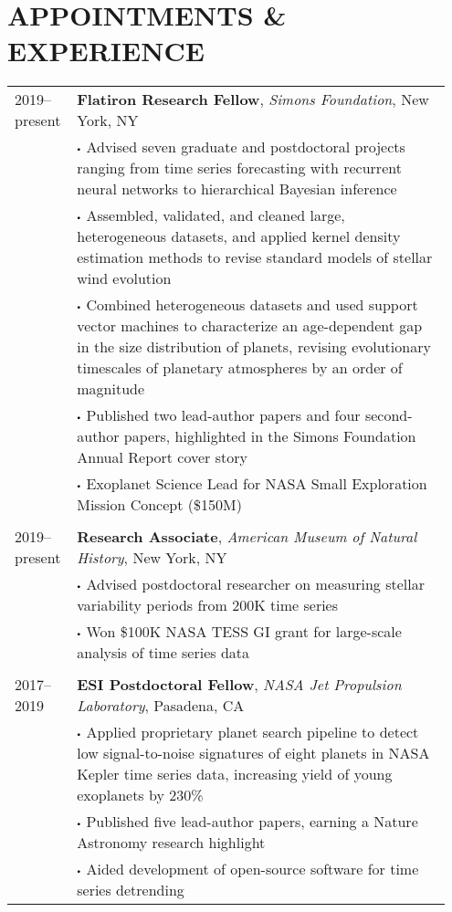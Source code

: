\iffalse 
\section{\large APPOINTMENTS \& EXPERIENCE}
\begin{tabular}{p{0.12\linewidth} p{0.83\linewidth}}
2019--present & \textbf{Flatiron Research Fellow}, \textit{Simons Foundation}, New York, NY\\
& $\sbullet$ Advised seven graduate and postdoctoral projects ranging from time series forecasting with recurrent neural networks to hierarchical Bayesian inference \\
& $\sbullet$ Assembled, validated, and cleaned large, heterogeneous datasets, and applied kernel density estimation methods to revise standard models of stellar wind evolution \\
& $\sbullet$ Combined heterogeneous datasets and used support vector machines to characterize an age-dependent gap in the size distribution of planets, revising evolutionary timescales of planetary atmospheres by an order of magnitude \\
& $\sbullet$ Published two lead-author papers and four second-author papers, highlighted in the Simons Foundation Annual Report cover story\\
& $\sbullet$ Exoplanet Science Lead for NASA Small Exploration Mission Concept (\$150M)\\
\\
2019--present & \textbf{Research Associate}, \textit{American Museum of Natural History}, New York, NY \\
& $\sbullet$ Advised postdoctoral researcher on measuring stellar variability periods from 200K time series\\
& $\sbullet$ Won \$100K NASA TESS GI grant for large-scale analysis of time series data \\
\\
2017--2019 & \textbf{ESI Postdoctoral Fellow}, \textit{NASA Jet Propulsion Laboratory}, Pasadena, CA\\
& $\sbullet$ Applied proprietary planet search pipeline to detect low signal-to-noise signatures of eight planets in NASA Kepler time series data, increasing yield of young exoplanets by 230\%\\
& $\sbullet$ Published five lead-author papers, earning a Nature Astronomy research highlight\\
& $\sbullet$ Aided development of open-source software for time series detrending\\

\end{tabular}
